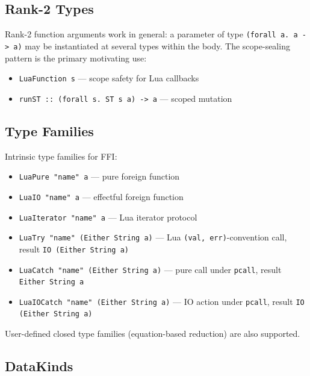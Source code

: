 \documentclass[11pt,a4paper]{article}
\begin{document}
\subsection{Rank-2 Types}

Rank-2 function arguments work in general: a parameter of type
\texttt{(forall a. a -> a)} may be instantiated at several types within
the body.  The scope-sealing pattern is the primary motivating use:
\begin{itemize}[nosep]
  \item \texttt{LuaFunction s} --- scope safety for Lua callbacks
  \item \texttt{runST :: (forall s. ST s a) -> a} --- scoped mutation
\end{itemize}

\subsection{Type Families}

Intrinsic type families for FFI:
\begin{itemize}[nosep]
  \item \texttt{LuaPure "name" a} --- pure foreign function
  \item \texttt{LuaIO "name" a} --- effectful foreign function
  \item \texttt{LuaIterator "name" a} --- Lua iterator protocol
  \item \texttt{LuaTry "name" (Either String a)} --- Lua
        \texttt{(val, err)}-convention call, result
        \texttt{IO (Either String a)}
  \item \texttt{LuaCatch "name" (Either String a)} --- pure call under
        \texttt{pcall}, result \texttt{Either String a}
  \item \texttt{LuaIOCatch "name" (Either String a)} --- IO action under
        \texttt{pcall}, result \texttt{IO (Either String a)}
\end{itemize}

User-defined closed type families (equation-based reduction) are also supported.

\subsection{DataKinds}
\end{document}
